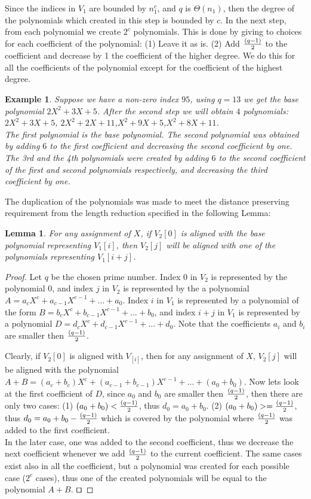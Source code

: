 \documentclass[11pt,amssymb]{article}
\newtheorem{lemma}[theorem]{Lemma}
\def\squareforqed{\hbox{\rlap{$\sqcap$}$\sqcup$}}
\newtheorem{example}{Example}
\newcommand{\qed}{\vrule height6pt width4pt\medskip}
\newcommand{\QED}{\hfill\qed}
\def\squareforqed{\hbox{\rlap{$\sqcap$}$\sqcup$}}
\def\qed{\ifmmode\squareforqed\else{\unskip\nobreak\hfil
\def\mod{\ {\rm mod}\ }
\penalty50\hskip1em\null\nobreak\hfil\squareforqed
\parfillskip=0pt\finalhyphendemerits=0\endgraf}\fi}
\begin{document}
Since the indices in $V_1$ are bounded by $n_1^c$, and $q$ is $\Theta
(n_1)$, then the degree of the polynomials which created in this step
is bounded by $c$. In the next step, from each polynomial we create
$2^c$ polynomials. This is done by giving to choices for each
coefficient of the polynomial: (1) Leave it as is. (2) Add $(q-1) \over
2$ to the coefficient and decrease by 1 the coefficient of the
higher degree. We do this for all the coefficients of the polynomial
except for the coefficient of the highest degree.

\begin{example}
Suppose we have a non-zero index $95$, using $q=13$ we get the base
polynomial $2X^2+3X+5$. After the second step we will obtain $4$
polynomials: $2X^2+3X+5$, $2X^2+2X+11$,$X^2+9X+5$,$X^2+8X+11$.\\
The first polynomial is the base polynomial. The second polynomial was
obtained by adding $6$ to the first coefficient and decreasing the
second coefficient by one. The 3rd and the 4th polynomials were created
by adding $6$ to the second coefficient of the first and second
polynomials respectively, and decreasing the third coefficient by one.
\end{example}

The duplication of the polynomials was made to meet the distance
preserving requirement from the length reduction specified in the
following Lemma:

\begin{lemma}\label{l:PolAllignment}
For any assignment of $X$, if $V_2[0]$ is aligned with the base
polynomial representing $V_1[i]$, then $V_2[j]$ will be aligned with
one of the polynomials representing $V_1[i+j]$.
\end{lemma}
\begin{proof}
Let $q$ be the chosen prime number. Index $0$ in $V_2$ is
represented by the polynomial $0$, and index $j$ in $V_2$ is
represented by the a polynomial $A=a_cX^c+a_{c-1}X^{c-1}+...+a_0$.
Index $i$ in $V_1$ is represented by a polynomial of the form
$B=b_cX^c+b_{c-1}X^{c-1}+...+b_0$, and index $i+j$ in $V_1$ is
represented by a polynomial $D=d_cX^c+d_{c-1}X^{c-1}+...+d_0$. Note
that the coefficients $a_i$ and $b_i$ are smaller then $(q-1) \over
2$.

Clearly, if $V_2[0]$ is aligned with $V_[i]$, then for any
assignment of $X$, $V_2[j]$ will be aligned with the polynomial
$A+B=(a_c+b_c)X^c+(a_{c-1}+b_{c-1})X^{c-1}+...+(a_0+b_0)$. Now lets
look at the first coefficient of $D$, since $a_0$ and $b_0$ are
smaller then $(q-1) \over 2$, then there are only two cases: (1)
$(a_0+b_0)<{(q-1) \over 2}$, thus $d_0=a_0+b_0$. (2)
$(a_0+b_0)>={(q-1) \over 2}$, thus $d_0=a_0+b_0-{(q-1) \over 2}$
which is covered by the
polynomial where $(q-1) \over 2$ was added to the first coefficient.\\
In the later case, one was added to the second coefficient, thus we
decrease the next coefficient whenever we add $(q-1) \over 2$ to the
current coefficient. The same cases exist also in all the
coefficient, but a polynomial was created for each possible case ($2^c$
cases), thus one of the created polynomials will be equal to the
polynomial $A+B$. $\QED$
\end{proof}
\end{document}
